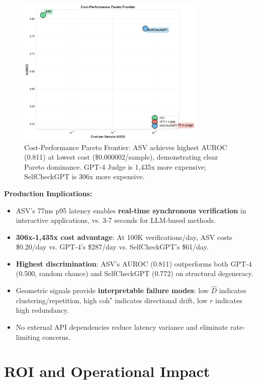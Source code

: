 \documentclass[11pt]{article}
\begin{document}
\begin{figure}[h]
\centering
\includegraphics[width=0.8\textwidth]{figures/baseline_cost_performance.png}
\caption{Cost-Performance Pareto Frontier: ASV achieves highest AUROC (0.811) at lowest cost (\$0.000002/sample), demonstrating clear Pareto dominance. GPT-4 Judge is 1,435x more expensive; SelfCheckGPT is 306x more expensive.}
\label{fig:baseline-cost-performance}
\end{figure}

\textbf{Production Implications:}
\begin{itemize}
\item ASV's 77ms p95 latency enables \textbf{real-time synchronous verification} in interactive applications, vs. 3-7 seconds for LLM-based methods.
\item \textbf{306x-1,435x cost advantage}: At 100K verifications/day, ASV costs \$0.20/day vs. GPT-4's \$287/day vs. SelfCheckGPT's \$61/day.
\item \textbf{Highest discrimination}: ASV's AUROC (0.811) outperforms both GPT-4 (0.500, random chance) and SelfCheckGPT (0.772) on structural degeneracy.
\item Geometric signals provide \textbf{interpretable failure modes}: low $\hat{D}$ indicates clustering/repetition, high $\text{coh}^\star$ indicates directional drift, low $r$ indicates high redundancy.
\item No external API dependencies reduce latency variance and eliminate rate-limiting concerns.
\end{itemize}

\section{ROI and Operational Impact}
\label{sec:roi}
\end{document}
